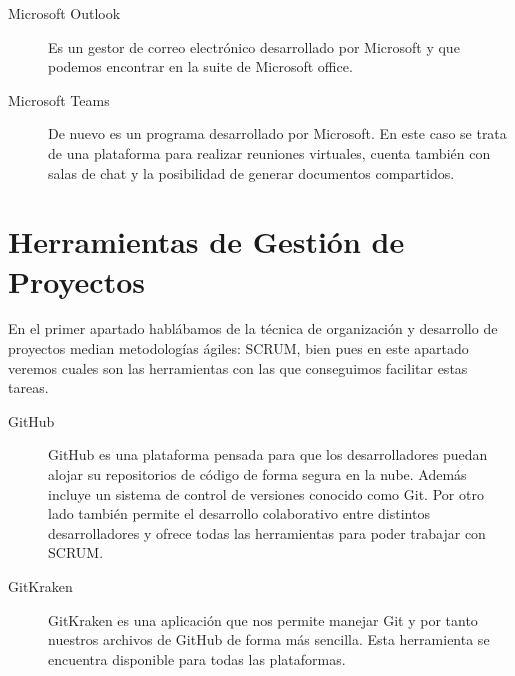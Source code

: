 \begin{description}
\item[Microsoft Outlook] Es un gestor de correo electrónico desarrollado por Microsoft y que podemos encontrar en la suite de Microsoft office.

\item[Microsoft Teams] De nuevo es un programa desarrollado por Microsoft. En este caso se trata de una plataforma para realizar reuniones virtuales, cuenta también con salas de chat y la posibilidad de generar documentos compartidos.
\end{description}


\section{Herramientas de Gestión de Proyectos}\label{sec:HGestionProyectos}
En el primer apartado hablábamos de la técnica de organización y desarrollo de proyectos median metodologías ágiles: SCRUM, bien pues en este apartado veremos cuales son las herramientas con las que conseguimos facilitar estas tareas.

\begin{description}
\item[GitHub]
GitHub es una plataforma pensada para que los desarrolladores puedan alojar su repositorios de código de forma segura en la nube. Además incluye un sistema de control de versiones conocido como Git. Por otro lado también permite el desarrollo colaborativo entre distintos desarrolladores y ofrece todas las herramientas para poder trabajar con SCRUM. 

\item[GitKraken]
GitKraken es una aplicación que nos permite manejar Git y por tanto nuestros archivos de GitHub de forma más sencilla. Esta herramienta se encuentra disponible para todas las plataformas.
\end{description}








